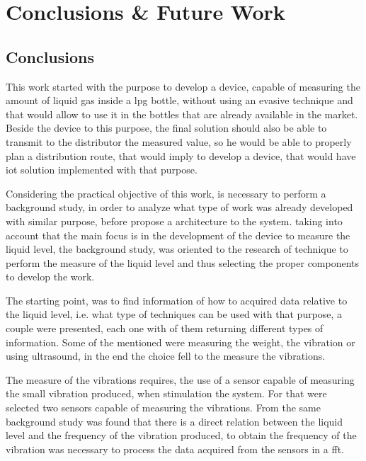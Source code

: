 \cleardoublepage
\chapter{Conclusions \& Future Work}\label{chap:finalremarks}
\label{sec:Conclusions}
\label{sec:FutureWork}
\section{Conclusions}
This work started with the purpose to develop a device, capable of measuring the amount of liquid gas inside a \acrshort{lpg} bottle, without using an evasive technique and that would allow to use it in the bottles that  are already available in the market. Beside the device to this purpose, the final solution should also be able to transmit to the distributor the measured value, so he would be able to properly plan a distribution route, that would imply to develop a device, that would have \acrshort{iot} solution implemented with that purpose. 

Considering the practical objective of this work, is necessary to perform a background study, in order to analyze what type of work was already developed with similar purpose, before propose a architecture to the system. taking into account that the main focus is in the development of the device to measure the liquid level, the background study, was oriented to the research of technique to perform the measure of the liquid level and thus selecting the proper components to develop the work.

The starting point, was to find information of how to acquired data relative to the liquid level, i.e. what type of techniques can be used with that purpose, a couple were presented, each one with of them returning different types of information. Some of the mentioned were measuring the weight, the vibration or using ultrasound, in the end the choice fell to the measure the vibrations. 

The measure of the vibrations requires, the use of a sensor capable of measuring the small vibration produced, when stimulation the system. For that were selected two sensors capable of measuring the vibrations. From the same background study was found that there is a direct relation between the liquid level and the frequency of the vibration produced, to obtain the frequency of the vibration was necessary to process the data acquired from the sensors in a \acrshort{fft}. 

